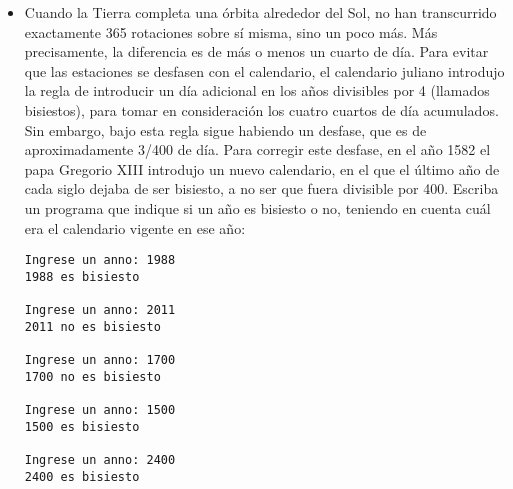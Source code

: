 \begin{itemize}
    \item
    Cuando la Tierra completa una órbita alrededor del Sol, no han transcurrido exactamente 365 rotaciones sobre sí misma, sino un poco más. Más precisamente, la diferencia es de más o menos un cuarto de día.
Para evitar que las estaciones se desfasen con el calendario, el calendario juliano introdujo la regla de introducir un día adicional en los años divisibles por 4 (llamados bisiestos), para tomar en consideración los cuatro cuartos de día acumulados.
Sin embargo, bajo esta regla sigue habiendo un desfase, que es de aproximadamente 3/400 de día.
Para corregir este desfase, en el año 1582 el papa Gregorio XIII introdujo un nuevo calendario, en el que el último año de cada siglo dejaba de ser bisiesto, a no ser que fuera divisible por 400.
Escriba un programa que indique si un año es bisiesto o no, teniendo en cuenta cuál era el calendario vigente en ese año:
    \begin{lstlisting}[style=consola]
Ingrese un anno: 1988
1988 es bisiesto

Ingrese un anno: 2011
2011 no es bisiesto

Ingrese un anno: 1700
1700 no es bisiesto

Ingrese un anno: 1500
1500 es bisiesto

Ingrese un anno: 2400
2400 es bisiesto
    \end{lstlisting}

\end{itemize}